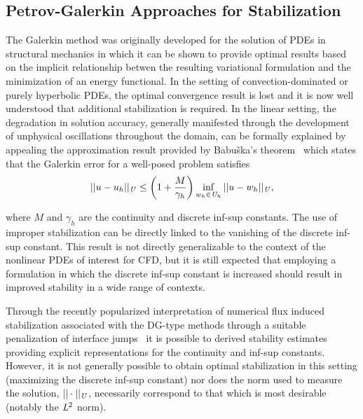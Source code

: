 \subsection{Petrov-Galerkin Approaches for Stabilization}
\label{sec:background_pg_stabilization}

The Galerkin method was originally developed for the solution of PDEs in
structural mechanics in which it can be shown to provide optimal results based
on the implicit relationship betwen the resulting variational formulation and
the minimization of an energy functional.
In the setting of convection-dominated or purely hyperbolic PDEs, the optimal
convergence result is lost and it is now well understood that additional
stabilization is required.
In the linear setting, the degradation in solution accuracy,
generally manifested through the development of unphysical oscillations
throughout the domain, can be formally explained by appealing the approximation
result provided by Babu\v{s}ka's theorem~\cite[Theorem ]{Babuska1971}
which states that the Galerkin error for a well-posed problem satisfies
\begin{align}
||u-u_h||_{\mathit{{{U}}}} \le \left( 1 + \frac{M}{\gamma_h} \right) \inf_{w_h \in \mathit{{{U}}}_h} ||u-w_h||_{\mathit{{{U}}}},
\end{align}

where $M$ and $\gamma_h$ are the continuity and discrete inf-sup constants. The
use of improper stabilization can be directly linked to the vanishing of the
discrete inf-sup constant. This result is not directly generalizable to
the context of the nonlinear PDEs of interest for CFD, but it is still expected
that employing a formulation in which the discrete inf-sup constant is increased
should result in improved stability in a wide range of contexts.

Through the recently popularized interpretation of numerical flux induced
stabilization associated with the DG-type methods through a suitable
penalization of interface jumps~\cite{Brezzi2004,DiPietro2011} it is possible to
derived stability estimates providing explicit representations for the
continuity and inf-sup constants. However, it is not generally possible to
obtain optimal stabilization in this setting (maximizing the discrete inf-sup
constant) nor does the norm used to measure the solution,
$||\cdot||_{\mathit{{{U}}}}$, necessarily correspond to that which is most
desirable (notably the $\mathit{{{L}}}^2$ norm).

